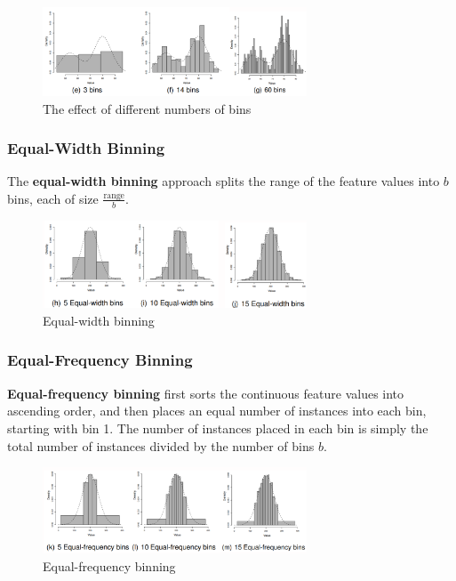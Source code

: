 \documentclass[a4paper,11pt]{article}
\begin{document}
\begin{figure}[H]
    \centering
    \includegraphics[width=0.7\textwidth]{images/numbins.png}
    \caption{The effect of different numbers of bins}
\end{figure}

\subsubsection{Equal-Width Binning}
The \textbf{equal-width binning} approach splits the range of the feature values into $b$ bins, each of size $\frac{\text{range}}{b}$.

\begin{figure}[H]
    \centering
    \includegraphics[width=0.7\textwidth]{images/equalbins.png}
    \caption{Equal-width binning}
\end{figure}

\subsubsection{Equal-Frequency Binning}
\textbf{Equal-frequency binning} first sorts the continuous feature values into ascending order, and then places an equal number of instances into each bin, starting with bin 1.
The number of instances placed in each bin is simply the total number of instances divided by the number of bins $b$.

\begin{figure}[H]
    \centering
    \includegraphics[width=0.7\textwidth]{images/freqbins.png}
    \caption{Equal-frequency binning}
\end{figure}
\end{document}
